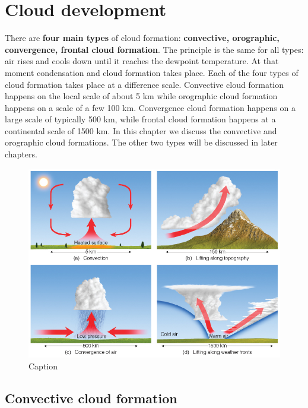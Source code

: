 \documentclass[12pt,oneside]{book}
\begin{document}
\section{Cloud development}\label{cloud-development}

There are \textbf{four main types} of cloud formation:
\textbf{convective, orographic, convergence, frontal cloud formation}.
The principle is the same for all types: air rises and cools down until
it reaches the dewpoint temperature. At that moment condensation and
cloud formation takes place. Each of the four types of cloud formation
takes place at a difference scale. Convective cloud formation happens on
the local scale of about 5 km while orographic cloud formation happens
on a scale of a few 100 km. Convergence cloud formation happens on a
large scale of typically 500 km, while frontal cloud formation happens
at a continental scale of 1500 km. In this chapter we discuss the
convective and orographic cloud formations. The other two types will be
discussed in later chapters.

\begin{figure}

{\centering \includegraphics[width=0.9\linewidth]{figures/Figure316} 

}

\caption{Caption}\label{fig:Cloud}
\end{figure}

\subsection{Convective cloud
formation}\label{convective-cloud-formation}
\end{document}

